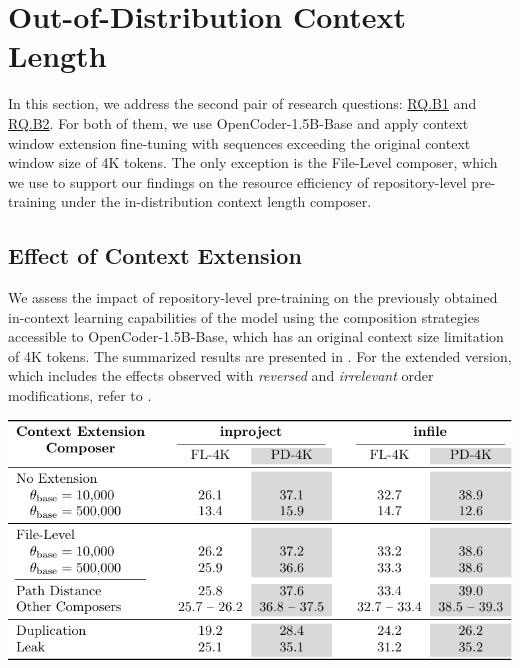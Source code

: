 \section{Out-of-Distribution Context Length}

In this section, we address the second pair of research questions: \hyperref[rq:rq-b1]{RQ.B1} and \hyperref[rq:rq-b2]{RQ.B2}. For both of them, we use OpenCoder-1.5B-Base and apply context window extension fine-tuning with sequences exceeding the original context window size of 4K tokens. The only exception is the File-Level composer, which we use to support our findings on the resource efficiency of repository-level pre-training under the in-distribution context length composer.

\subsection{Effect of Context Extension}\label{sec:effect-of-context-extension}

We assess the impact of repository-level pre-training on the previously obtained in-context learning capabilities of the model using the composition strategies accessible to OpenCoder-1.5B-Base, which has an original context size limitation of 4K tokens. The summarized results are presented in . For the extended version, which includes the effects observed with \textit{reversed} and \textit{irrelevant} order modifications, refer to .

\begin{table}[htbp]
    \centering
    \includegraphics[width=\textwidth]{tables/rq-b1.pdf}
    \label{tab:ocoder-in-context-retention}
\end{table}

